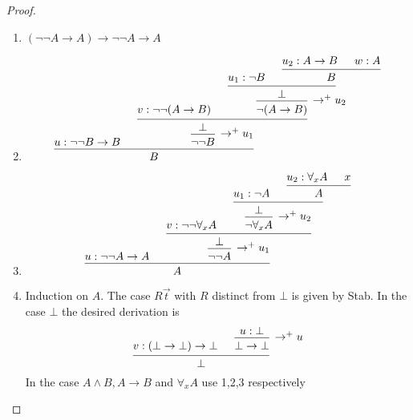 \documentclass[11pt]{article}
\begin{document}
\begin{proof}
\begin{enumerate}
\item \((\neg\neg A\to A)\to\neg\neg A\to A\)
\setcounter{enumi}{1}
\item \begin{equation*}
\begin{prooftree}[center=false]
\hypo{u:\neg\neg B\to B}
\hypo{v:\neg\neg(A\to B)}
\hypo{u_1:\neg B}
\hypo{u_2:A\to B}
\hypo{w:A}
\infer2{B}
\infer2{\bot}
\infer1[\(\to^+u_2\)]{\neg(A\to B)}
\infer2{
\begin{prooftree}[center=false]
\hypo{\bot}\infer1[\(\to^+u_1\)]{\neg\neg B}
\end{prooftree}
}
\infer2{B}
\end{prooftree}
\end{equation*}
\item \begin{equation*}
\begin{prooftree}[center=false]
\hypo{u:\neg\neg A\to A}
\hypo{v:\neg\neg\forall_xA}
\hypo{u_1:\neg A}
\hypo{u_2:\forall_xA}
\hypo{x}
\infer2{A}
\infer2{
\begin{prooftree}[center=false]
\hypo{\bot}\infer1[\(\to^+u_2\)]{\neg\forall_xA}
\end{prooftree}
}
\infer2{\begin{prooftree}[center=false]
\hypo{\bot}\infer1[\(\to^+u_1\)]{\neg\neg A}
\end{prooftree}}
\infer2{A}
\end{prooftree}
\end{equation*}
\item Induction on \(A\). The case \(R\vec{t}\) with \(R\) distinct from
\(\bot\) is given by Stab. In the case \(\bot\) the desired derivation is
\begin{equation*}
\begin{prooftree}[center=false]
\hypo{v:(\bot\to\bot)\to\bot}
\hypo{u:\bot}
\infer1[\(\to^+u\)]{\bot\to\bot}
\infer2{\bot}
\end{prooftree}
\end{equation*}
In the case \(A\wedge B,A\to B\) and \(\forall_xA\) use 1,2,3 respectively
\end{enumerate}
\end{proof}
\end{document}

